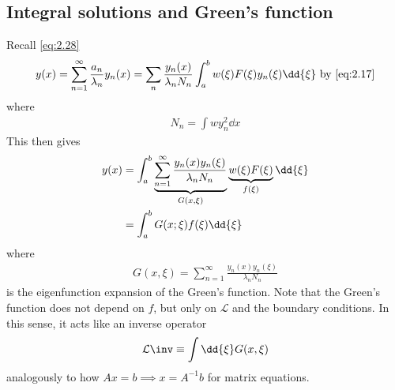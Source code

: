 \subsection{Integral solutions and Green's function}
Recall \cref{eq:2.28}
\begin{align*}
    y(x) = \sum_{n=1}^\infty \frac{a_n}{\lambda_n} y_n(x) = \sum_n \frac{y_n(x)}{\lambda_n N_n} \int_a^b w(\xi) F(\xi) y_n(\xi) \dd{\xi} \text{ by \cref{eq:2.17}}
\end{align*}
where
\begin{align*}
    N_n = \int w y_n^2 \dd{x}
\end{align*}
This then gives
\begin{align}
    y(x) &= \int_a^b \underbrace{\sum_{n=1}^\infty \frac{y_n(x) y_n(\xi)}{\lambda_n N_n}}_{G(x,\xi)} \underbrace{w(\xi) F(\xi)}_{f(\xi)} \dd{\xi} \notag\\
    &= \int_a^b G(x;\xi) f(\xi) \dd{\xi} \label{eq:2.31}
\end{align}
where
\begin{align*}
    G(x,\xi) = \sum_{n=1}^\infty \frac{y_n(x) y_n(\xi)}{\lambda_n N_n}
\end{align*}
is the eigenfunction expansion of the Green's function.
Note that the Green's function does not depend on $f$, but only on $\mathcal L$ and the boundary conditions.
In this sense, it acts like an inverse operator
\begin{align*}
    \mathcal L\inv \equiv \int \dd{\xi} G(x,\xi)
\end{align*}
analogously to how $Ax = b \implies x = A^{-1} b$ for matrix equations.